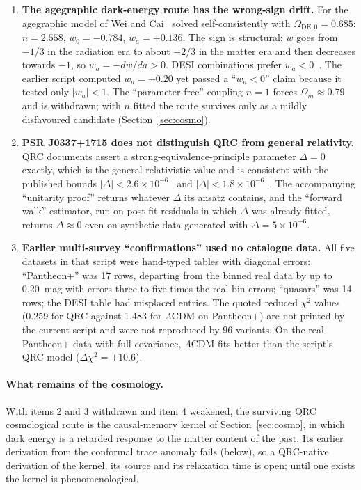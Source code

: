 \documentclass[11pt]{article}
\theoremstyle{definition}
\theoremstyle{remark}
\begin{document}
\begin{enumerate}
  backreaction proposed alongside it is absorbed by the supernova absolute magnitude
  and is withdrawn with it.
\item \textbf{The agegraphic dark-energy route has the wrong-sign drift.} For the agegraphic
  model of Wei and Cai~\cite{wei2008} solved self-consistently with
  $\Omega_{\mathrm{DE},0}=0.685$: $n=2.558$, $w_0=-0.784$, $w_a=+0.136$. The sign is
  structural: $w$ goes from $-1/3$ in the radiation era to about $-2/3$ in the matter era
  and then decreases towards $-1$, so $w_a=-dw/da>0$. DESI combinations prefer
  $w_a<0$~\cite{desi2024}. The earlier script computed $w_a=+0.20$ yet passed a ``$w_a<0$''
  claim because it tested only $|w_a|<1$. The ``parameter-free'' coupling $n=1$ forces
  $\Omega_m\approx0.79$ and is withdrawn; with $n$ fitted the route survives only as a
  mildly disfavoured candidate (Section~\ref{sec:cosmo}).
\item \textbf{PSR J0337+1715 does not distinguish QRC from general relativity.} QRC
  documents assert a strong-equivalence-principle parameter $\Delta=0$ exactly, which is
  the general-relativistic value and is consistent with the published bounds
  $|\Delta|<2.6\times10^{-6}$~\cite{archibald2018} and
  $|\Delta|<1.8\times10^{-6}$~\cite{voisin2020}. The accompanying ``unitarity proof''
  returns whatever $\Delta$ its ansatz contains, and the ``forward walk'' estimator, run
  on post-fit residuals in which $\Delta$ was already fitted, returns $\Delta\approx0$
  even on synthetic data generated with $\Delta=5\times10^{-6}$.
\item \textbf{Earlier multi-survey ``confirmations'' used no catalogue data.} All five
  datasets in that script were hand-typed tables with diagonal errors: ``Pantheon+'' was
  17 rows, departing from the binned real data by up to 0.20~mag with errors three to
  five times the real bin errors; ``quasars'' was 14 rows; the DESI table had misplaced
  entries. The quoted reduced $\chi^2$ values (0.259 for QRC against 1.483 for
  $\Lambda$CDM on Pantheon+) are not printed by the current script and were not
  reproduced by 96 variants. On the real Pantheon+ data with full covariance,
  $\Lambda$CDM fits better than the script's QRC model ($\Delta\chi^2=+10.6$).
\end{enumerate}

\paragraph{What remains of the cosmology.} With items 2 and 3 withdrawn and item 4
weakened, the surviving QRC cosmological route is the causal-memory kernel of
Section~\ref{sec:cosmo}, in which dark energy is a retarded response to the matter
content of the past. Its earlier derivation from the conformal trace anomaly fails
(below), so a QRC-native derivation of the kernel, its source and its relaxation time is
open; until one exists the kernel is phenomenological.
\end{document}
